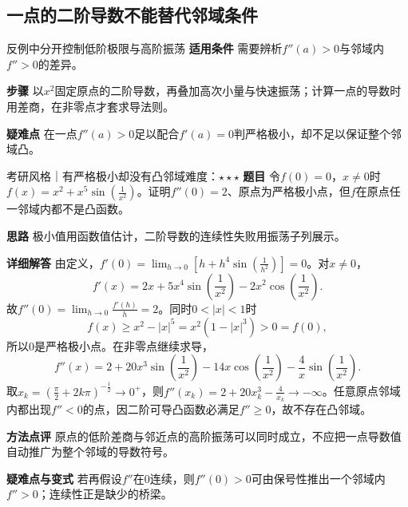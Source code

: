 \subsection{一点的二阶导数不能替代邻域条件}
\begin{method}{反例中分开控制低阶极限与高阶振荡}
\textbf{适用条件} 需要辨析$f''(a)>0$与邻域内$f''>0$的差异。\par
\textbf{步骤} 以$x^2$固定原点的二阶导数，再叠加高次小量与快速振荡；计算一点的导数时用差商，在非零点才套求导法则。\par
\textbf{疑难点} 在一点$f''(a)>0$足以配合$f'(a)=0$判严格极小，却不足以保证整个邻域凸。
\end{method}
\begin{example}{考研风格｜有严格极小却没有凸邻域}{难度：$\star\star\star$}\label{cd:ex:point-convex}
\textbf{题目} 令$f(0)=0$，$x\ne0$时$f(x)=x^2+x^5\sin(\frac{1}{x^2})$。证明$f''(0)=2$、原点为严格极小点，但$f$在原点任一邻域内都不是凸函数。\par
\textbf{思路} 极小值用函数值估计，二阶导数的连续性失败用振荡子列展示。\par
\textbf{详细解答} 由定义，$f'(0)=\lim_{h\to0}[h+h^4\sin(\frac{1}{h^2})]=0$。对$x\ne0$，
\[
 f'(x)=2x+5x^4\sin(\dfrac{1}{x^2})-2x^2\cos(\dfrac{1}{x^2}).
\]
故$f''(0)=\lim_{h\to0}\frac{f'(h)}{h}=2$。同时$0<|x|<1$时
\[
 f(x)\ge x^2-|x|^5=x^2(1-|x|^3)>0=f(0),
\]
所以0是严格极小点。在非零点继续求导，
\[
 f''(x)=2+20x^3\sin(\dfrac{1}{x^2})
          -14x\cos(\dfrac{1}{x^2})-\dfrac4x\sin(\dfrac{1}{x^2}).
\]
取$x_k=(\frac{\pi}{2}+2k\pi)^{-\frac{1}{2}}\to0^+$，则$f''(x_k)=2+20x_k^3-\frac{4}{x_k}\to-\infty$。任意原点邻域内都出现$f''<0$的点，因二阶可导凸函数必满足$f''\ge0$，故不存在凸邻域。\par
\textbf{方法点评} 原点的低阶差商与邻近点的高阶振荡可以同时成立，不应把一点导数值自动推广为整个邻域的导数符号。\par
\textbf{疑难点与变式} 若再假设$f''$在0连续，则$f''(0)>0$可由保号性推出一个邻域内$f''>0$；连续性正是缺少的桥梁。
\end{example}

